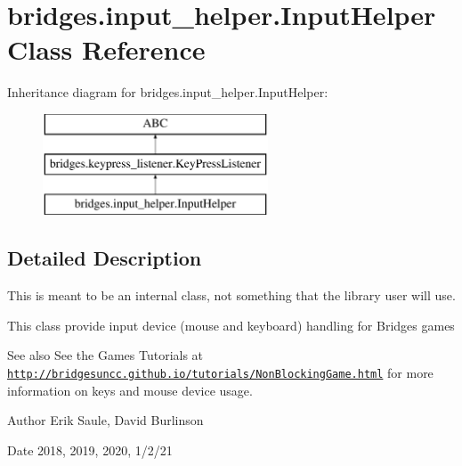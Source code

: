 \hypertarget{classbridges_1_1input__helper_1_1_input_helper}{}\section{bridges.\+input\+\_\+helper.\+Input\+Helper Class Reference}
\label{classbridges_1_1input__helper_1_1_input_helper}
Inheritance diagram for bridges.\+input\+\_\+helper.\+Input\+Helper\+:\begin{figure}[H]
\begin{center}
\leavevmode
\includegraphics[height=3.000000cm]{classbridges_1_1input__helper_1_1_input_helper}
\end{center}
\end{figure}


\subsection{Detailed Description}
This is meant to be an internal class, not something that the library user will use. 

This class provide input device (mouse and keyboard) handling for Bridges games

\begin{DoxySeeAlso}{See also}
See the Games Tutorials at \href{http://bridgesuncc.github.io/tutorials/NonBlockingGame.html}{\tt http\+://bridgesuncc.\+github.\+io/tutorials/\+Non\+Blocking\+Game.\+html} for more information on keys and mouse device usage.
\end{DoxySeeAlso}
\begin{DoxyAuthor}{Author}
Erik Saule, David Burlinson 
\end{DoxyAuthor}
\begin{DoxyDate}{Date}
2018, 2019, 2020, 1/2/21 
\end{DoxyDate}
